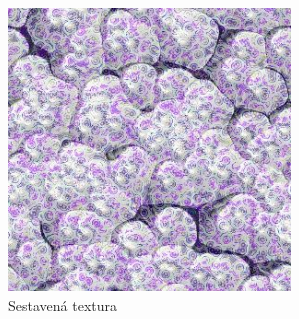 \begin{figure}[h]
\centering
\includegraphics[width=7.5cm,keepaspectratio]{obr/slozeni.jpg}
\caption{Sestavená textura}
\label{fig:slozenina}
\end{figure}

